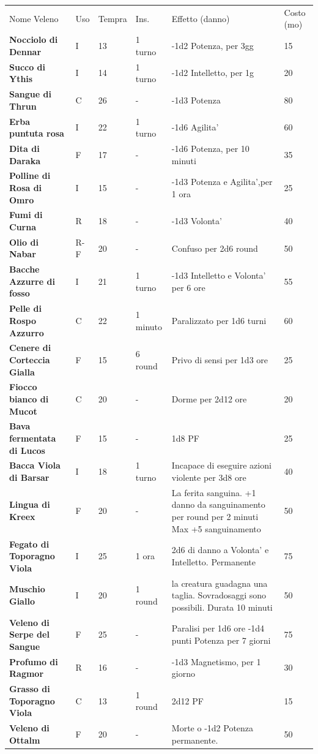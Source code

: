 \documentclass[a4paper,11pt,twoside,openany]{dndbook}
\begin{document}
{\begin{longtable}{|k{4cm} |k{1cm} |k{1.5cm}| k{1.5cm} |k{5.5cm} |k{1.5cm}|}
	Nome Veleno & Uso & Tempra & Ins. & Effetto (danno) & Costo (mo)\tabularnewline
	\textbf{Nocciolo di Dennar}  & I & 13 & 1 turno & -1d2 Potenza, per 3gg & 15\tabularnewline
	\textbf{Succo di Ythis} & I & 14 & 1 turno & -1d2 Intelletto, per 1g & 20\tabularnewline
	\textbf{Sangue di Thrun}  & C & 26 & - & -1d3 Potenza & 80\tabularnewline
	\textbf{Erba puntuta rosa}  & I & 22 & 1 turno & -1d6 Agilita' & 60\tabularnewline
	\textbf{Dita di Daraka} & F & 17 & - & -1d6 Potenza, per 10 minuti & 35\tabularnewline
	\textbf{Polline di Rosa di Omro} & I & 15 & - & -1d3 Potenza e Agilita',per 1 ora & 25\tabularnewline
	\textbf{Fumi di Curna} & R & 18 & - & -1d3 Volonta' & 40\tabularnewline
	\textbf{Olio di Nabar}  & R-F & 20 & - & Confuso per 2d6 round & 50\tabularnewline
	\textbf{Bacche Azzurre di fosso}  & I & 21 & 1 turno & -1d3 Intelletto e Volonta' per 6 ore & 55\tabularnewline
	\textbf{Pelle di Rospo Azzurro}  & C & 22 & 1 minuto & Paralizzato per 1d6 turni & 60\tabularnewline
	\textbf{Cenere di Corteccia Gialla}  & F & 15 & 6 round & Privo di sensi per 1d3 ore & 25\tabularnewline
	\textbf{Fiocco bianco di Mucot} & C & 20 & - & Dorme per 2d12 ore & 20\tabularnewline
	\textbf{Bava fermentata di Lucos}  & F & 15 & - & 1d8 PF & 25\tabularnewline
	\textbf{Bacca Viola di Barsar} & I & 18 & 1 turno & Incapace di eseguire azioni violente per 3d8 ore & 40\\
	\textbf{Lingua di Kreex}  & F & 20 & - & La ferita sanguina. +1 danno da sanguinamento per round per 2 minuti Max +5 sanguinamento & 50 \\
	\textbf{Fegato di Toporagno Viola} & I & 25 & 1 ora & 2d6 di danno a Volonta' e Intelletto. Permanente & 75\\
	\textbf{Muschio Giallo}  & I & 20 & 1 round & la creatura guadagna una taglia. Sovradosaggi sono possibili. Durata 10 minuti & 50\tabularnewline
	\textbf{Veleno di Serpe del Sangue}  & F & 25 & - & Paralisi per 1d6 ore -1d4 punti Potenza per 7 giorni & 75\\
	\textbf{Profumo di Ragmor} & R & 16 & - & -1d3 Magnetismo, per 1 giorno & 30\tabularnewline
	\textbf{Grasso di Toporagno Viola}  & C & 13 & 1 round & 2d12 PF & 15\tabularnewline
	\textbf{Veleno di Ottalm} & F & 20 & - & Morte o -1d2 Potenza permanente. & 50\tabularnewline
\end{longtable}


}
\end{document}
